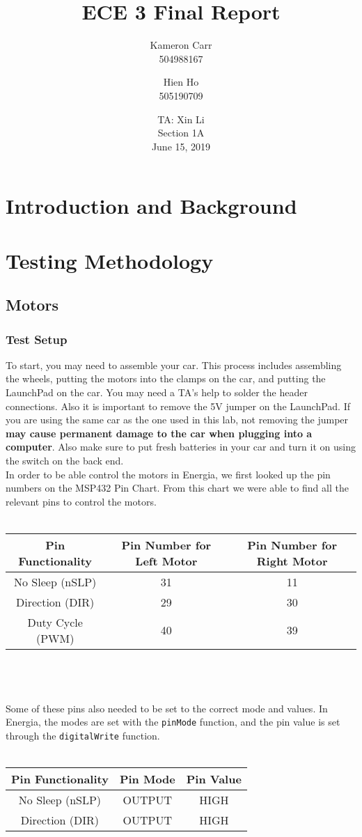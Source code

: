 \documentclass[12pt]{article}
\title{ECE 3 Final Report}
\author{Kameron Carr \\ 504988167 \and Hien Ho \\ 505190709}
\date{TA: Xin Li \\ Section 1A \\ June 15, 2019}
\begin{document}
\maketitle

\section{Introduction and Background}

\section{Testing Methodology}
\subsection{Motors}
\subsubsection{Test Setup}
To start, you may need to assemble your car. This process includes assembling the wheels, putting the motors into the clamps on the car, and putting the LaunchPad on the car. You may need a TA's help to solder the header connections. Also it is important to remove the 5V jumper on the LaunchPad. If you are using the same car as the one used in this lab, not removing the jumper \textbf{may cause permanent damage to the car when plugging into a computer}. Also make sure to put fresh batteries in your car and turn it on using the switch on the back end.
\\
In order to be able control the motors in Energia, we first looked up the pin numbers on the MSP432 Pin Chart. From this chart we were able to find all the relevant pins to control the motors.
\\ \\
\begin{tabu}{|c|c|c|}
\hline
\textbf{Pin Functionality} & \textbf{Pin Number for Left Motor} & \textbf{Pin Number for Right Motor} \\ \hline
No Sleep (nSLP) & 31 & 11 \\
Direction (DIR) & 29 & 30 \\
Duty Cycle (PWM) & 40 & 39 \\
\hline
\end{tabu}
\\ \\ \\
Some of these pins also needed to be set to the correct mode and values. In Energia, the modes are set with the \texttt{pinMode} function, and the pin value is set through the \texttt{digitalWrite} function.
\\ \\
\begin{tabu}{|c|c|c|}
\hline
\textbf{Pin Functionality} & \textbf{Pin Mode} & \textbf{Pin Value} \\ \hline
No Sleep (nSLP) & OUTPUT & HIGH \\
Direction (DIR) & OUTPUT & HIGH \\
\hline
\end{tabu} \\ \\
\end{document}
